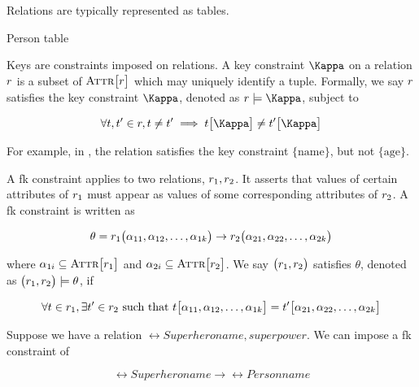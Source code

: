 	Relations are typically represented as tables.
	
	\begin{table}[!ht]
		\centering
		
		
		\caption{Person table}
		\label{tbl:person}
	\end{table}
	
	\begin{defn}[Keys]
	\label{def:keys}
		Keys are constraints imposed on relations.  A key constraint $\key$ on a relation $r$ is a subset of $\textsc{Attr}\bigl[r\bigr]$ which may uniquely identify a tuple.  Formally, we say $r$ satisfies the key constraint $\key$, denoted as $\relation \models \key$, subject to
		
		\[
			\forall \tuple, \tuple' \in \relation, \tuple \not= \tuple' \implies \tuple\bigl[\key\bigr] \not= \tuple'\bigl[\key\bigr]
		\]
		
		For example, in , the relation satisfies the key constraint $\bigl\{\mathrm{name}\bigr\}$, but not $\bigl\{\mathrm{age}\bigr\}$.
	\end{defn}
	
	\begin{defn}
	\label{def:foreign-keys}
		A \gls{fk} constraint applies to two relations, $r_1, r_2$.  It asserts that values of certain attributes of $r_1$ must appear as values of some corresponding attributes of $r_2$.  A \gls{fk} constraint is written as
		
		\[
			\theta = r_1\bigl(\alpha_{11}, \alpha_{12}, \dotsc, \alpha_{1k}\bigr) \rightarrow r_2\bigl(\alpha_{21}, \alpha_{22}, \dotsc, \alpha_{2k}\bigr)
		\]
		
		where $\alpha_{1i} \subseteq \textsc{Attr}\bigl[r_1\bigr]$ and $\alpha_{2i} \subseteq \textsc{Attr}\bigl[r_2\bigr]$.  We say $\bigl(r_1, r_2\bigr)$ satisfies $\theta$, denoted as $\bigl(r_1, r_2\bigr) \models \theta$, if
		
		\[
			\forall t \in r_1, \exists t' \in r_2 \text{ such that } t\bigl[\alpha_{11}, \alpha_{12}, \dotsc, \alpha_{1k}\bigr] = t'\bigl[\alpha_{21}, \alpha_{22}, \dotsc, \alpha_{2k}\bigr]
		\]
		
		\begin{ex}
			Suppose we have a relation $\rel{Superhero}{name, superpower}$.  We can impose a \gls{fk} constraint of
			
			\[
				\rel{Superhero}{name} \rightarrow \rel{Person}{name}
			\]
		\end{ex}
	\end{defn}
	
